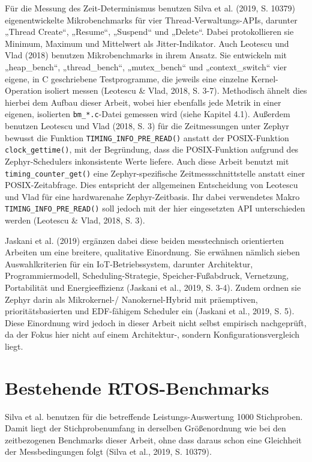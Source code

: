 Für die Messung des Zeit-Determinismus benutzen Silva et al. (2019, S. 10379) eigenentwickelte Mikrobenchmarks für vier Thread-Verwaltungs-APIs, darunter „Thread Create“, „Resume“, „Suspend“ und „Delete“. Dabei protokollieren sie Minimum, Maximum und Mittelwert als Jitter-Indikator. Auch Leotescu und Vlad (2018) benutzen Mikrobenchmarks in ihrem Ansatz. Sie entwickeln mit „heap\_bench“, „thread\_bench“, „mutex\_bench“ und „context\_switch“ vier eigene, in C geschriebene Testprogramme, die jeweils eine einzelne Kernel-Operation isoliert messen (Leotescu \& Vlad, 2018, S. 3-7). Methodisch ähnelt dies hierbei dem Aufbau dieser Arbeit, wobei hier ebenfalls jede Metrik in einer eigenen, isolierten \lstinline[style=fileinline]|bm_*.c|-Datei gemessen wird (siehe Kapitel 4.1). Außerdem benutzen Leotescu und Vlad (2018, S. 3) für die Zeitmessungen unter Zephyr bewusst die Funktion \lstinline[style=fileinline]|TIMING_INFO_PRE_READ()| anstatt der POSIX-Funktion \lstinline[style=fileinline]|clock_gettime()|, mit der Begründung, dass die POSIX-Funktion aufgrund des Zephyr-Schedulers inkonsistente Werte liefere. Auch diese Arbeit benutzt mit \lstinline[style=fileinline]|timing_counter_get()| eine Zephyr-spezifische Zeitmessschnittstelle anstatt einer POSIX-Zeitabfrage. Dies entspricht der allgemeinen Entscheidung von Leotescu und Vlad für eine hardwarenahe Zephyr-Zeitbasis. Ihr dabei verwendetes Makro \lstinline[style=fileinline]|TIMING_INFO_PRE_READ()| soll jedoch mit der hier eingesetzten API unterschieden werden (Leotescu \& Vlad, 2018, S. 3).

Jaskani et al. (2019) ergänzen dabei diese beiden messtechnisch orientierten Arbeiten um eine breitere, qualitative Einordnung. Sie erwähnen nämlich sieben Auswahlkriterien für ein IoT-Betriebssystem, darunter Architektur, Programmiermodell, Scheduling-Strategie, Speicher-Fußabdruck, Vernetzung, Portabilität und Energieeffizienz (Jaskani et al., 2019, S. 3-4). Zudem ordnen sie Zephyr darin als Mikrokernel-/ Nanokernel-Hybrid mit präemptiven, prioritätsbasierten und EDF-fähigem Scheduler ein (Jaskani et al., 2019, S. 5). Diese Einordnung wird jedoch in dieser Arbeit nicht selbst empirisch nachgeprüft, da der Fokus hier nicht auf einem Architektur-, sondern Konfigurationsvergleich liegt.

\section{Bestehende RTOS-Benchmarks}
Silva et al. benutzen für die betreffende Leistungs-Auswertung 1000 Stichproben. Damit liegt der Stichprobenumfang in derselben Größenordnung wie bei den zeitbezogenen Benchmarks dieser Arbeit, ohne dass daraus schon eine Gleichheit der Messbedingungen folgt (Silva et al., 2019, S. 10379).

